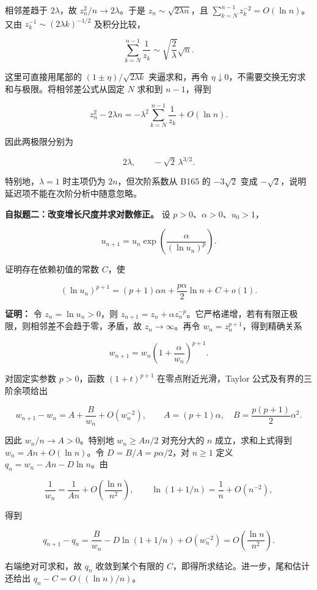 \documentclass[11pt,a4paper]{article}
\begin{document}
相邻差趋于 \(2\lambda\)，故 \(z_n^2/n\to2\lambda\)。于是
\(z_n\sim\sqrt{2\lambda n}\)，且
\(\sum_{k=N}^{n-1}z_k^{-2}=O(\ln n)\)。又由
\(z_k^{-1}\sim(2\lambda k)^{-1/2}\) 及积分比较，

\[
\sum_{k=N}^{n-1}\frac1{z_k}\sim\sqrt{\frac2\lambda}\sqrt n.
\]

这里可直接用尾部的 \((1\pm\eta)/\sqrt{2\lambda k}\) 夹逼求和，再令
\(\eta\downarrow0\)，不需要交换无穷求和与极限。将相邻差公式从固定 \(N\)
求和到 \(n-1\)，得到

\[
z_n^2-2\lambda n
=-\lambda^2\sum_{k=N}^{n-1}\frac1{z_k}+O(\ln n).
\]

因此两极限分别为

\[
\boxed{2\lambda,\qquad-\sqrt2\,\lambda^{3/2}.}
\]

特别地，\(\lambda=1\) 时主项仍为 \(2n\)，但次阶系数从 B165 的
\(-3\sqrt2\) 变成 \(-\sqrt2\)，说明延迟项不能在次阶分析中随意忽略。

\textbf{自拟题二：改变增长尺度并求对数修正。} 设
\(p>0\)、\(\alpha>0\)、\(u_0>1\)，

\[
u_{n+1}=u_n\exp\left(\frac\alpha{(\ln u_n)^p}\right).
\]

证明存在依赖初值的常数 \(C\)，使

\[
(\ln u_n)^{p+1}=(p+1)\alpha n+\frac{p\alpha}{2}\ln n+C+o(1).
\]

\textbf{证明：} 令 \(z_n=\ln u_n>0\)，则
\(z_{n+1}=z_n+\alpha z_n^{-p}\)。它严格递增，若有有限正极限，则相邻差不会趋于零，矛盾，故
\(z_n\to\infty\)。再令 \(w_n=z_n^{p+1}\)，得到精确关系

\[
w_{n+1}=w_n\left(1+\frac\alpha{w_n}\right)^{p+1}.
\]

对固定实参数 \(p>0\)，函数 \((1+t)^{p+1}\) 在零点附近光滑，Taylor
公式及有界的三阶余项给出

\[
w_{n+1}-w_n=A+\frac B{w_n}+O(w_n^{-2}),
\qquad A=(p+1)\alpha,\quad B=\frac{p(p+1)}2\alpha^2.
\]

因此 \(w_n/n\to A>0\)。特别地 \(w_n\ge An/2\) 对充分大的 \(n\)
成立，求和上式得到 \(w_n=An+O(\ln n)\)。令 \(D=B/A=p\alpha/2\)，对
\(n\ge1\) 定义 \(q_n=w_n-An-D\ln n\)。由

\[
\frac1{w_n}=\frac1{An}+O\left(\frac{\ln n}{n^2}\right),\qquad
\ln(1+1/n)=\frac1n+O(n^{-2}),
\]

得到

\[
q_{n+1}-q_n
=\frac B{w_n}-D\ln(1+1/n)+O(w_n^{-2})
=O\left(\frac{\ln n}{n^2}\right).
\]

右端绝对可求和，故 \(q_n\) 收敛到某个有限的
\(C\)，即得所求结论。进一步，尾和估计还给出 \(q_n-C=O((\ln n)/n)\)。
\end{document}
